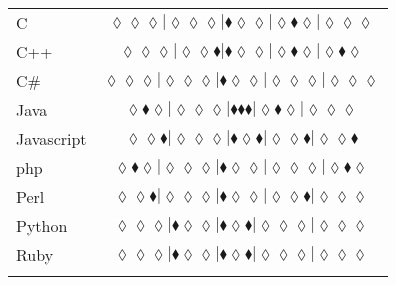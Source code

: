 \begin{table*}
{\begin{tabular}{l c}
C & $\scriptscriptstyle\lozenge\lozenge\lozenge|\lozenge\lozenge\lozenge|\blacklozenge\lozenge\lozenge|\lozenge\blacklozenge\lozenge|\lozenge\lozenge\lozenge$ \\
C++ & $\scriptscriptstyle\lozenge\lozenge\lozenge|\lozenge\lozenge\blacklozenge|\blacklozenge\lozenge\lozenge|\lozenge\blacklozenge\lozenge|\lozenge\blacklozenge\lozenge$ \\
C\# & $\scriptscriptstyle\lozenge\lozenge\lozenge|\lozenge\lozenge\lozenge|\blacklozenge\lozenge\lozenge|\lozenge\lozenge\lozenge|\lozenge\lozenge\lozenge$ \\
Java & $\scriptscriptstyle\lozenge\blacklozenge\lozenge|\lozenge\lozenge\lozenge|\blacklozenge\blacklozenge\blacklozenge|\lozenge\blacklozenge\lozenge|\lozenge\lozenge\lozenge$ \\
Javascript & $\scriptscriptstyle\lozenge\lozenge\blacklozenge|\lozenge\lozenge\lozenge|\blacklozenge\lozenge\blacklozenge|\lozenge\lozenge\blacklozenge|\lozenge\lozenge\blacklozenge$ \\
{\sc php} & $\scriptscriptstyle\lozenge\blacklozenge\lozenge|\lozenge\lozenge\lozenge|\blacklozenge\lozenge\lozenge|\lozenge\lozenge\lozenge|\lozenge\blacklozenge\lozenge$ \\
Perl & $\scriptscriptstyle\lozenge\lozenge\blacklozenge|\lozenge\lozenge\lozenge|\blacklozenge\lozenge\lozenge|\lozenge\lozenge\blacklozenge|\lozenge\lozenge\lozenge$ \\
Python & $\scriptscriptstyle\lozenge\lozenge\lozenge|\blacklozenge\lozenge\lozenge|\blacklozenge\lozenge\blacklozenge|\lozenge\lozenge\lozenge|\lozenge\lozenge\lozenge$ \\
Ruby & $\scriptscriptstyle\lozenge\lozenge\lozenge|\blacklozenge\lozenge\lozenge|\blacklozenge\lozenge\blacklozenge|\lozenge\lozenge\lozenge|\lozenge\lozenge\lozenge$ \\

\hline
& \\
\end{tabular}
} 
\end{table*}
